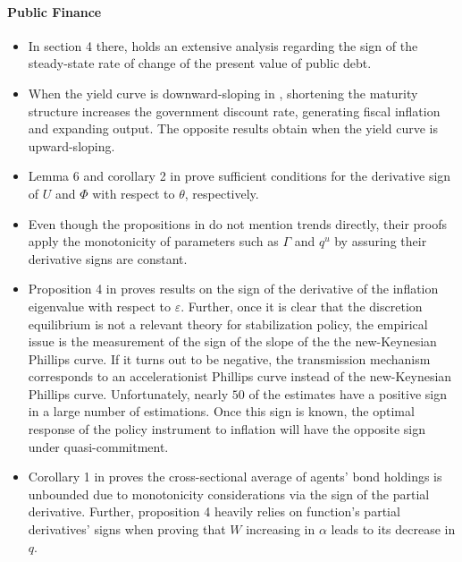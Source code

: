 \documentclass[11pt]{book}
\begin{document}
\paragraph{Public Finance}
\begin{itemize}
\item In section 4 there, \cite{englmann2015can}
holds an extensive analysis regarding the sign of the steady-state
rate of change of the present value of public debt.
\item When the yield curve is downward-sloping in \cite{corhay2016government},
shortening the maturity structure increases the government discount
rate, generating fiscal inflation and expanding output. The opposite
results obtain when the yield curve is upward-sloping.
\item Lemma 6 and corollary 2 in \cite{bursian2018trust}
prove sufficient conditions for the derivative sign of $U$ and $\Phi$
with respect to $\theta$, respectively.
\item Even though the propositions in \cite{haslag2020monetary}
do not mention trends directly, their proofs apply the monotonicity
of parameters such as $\Gamma$ and $q^{u}$ by assuring their derivative
signs are constant.
\item Proposition 4 in \cite{chatelain2021imperfect}
proves results on the sign of the derivative of the inflation eigenvalue
with respect to $\varepsilon$. Further, once it is clear that the
discretion equilibrium is not a relevant theory for stabilization
policy, the empirical issue is the measurement of the sign of the
slope of the the new-Keynesian Phillips curve. If it turns out to
be negative, the transmission mechanism corresponds to an accelerationist
Phillips curve instead of the new-Keynesian Phillips curve. Unfortunately,
nearly $50$ of the estimates have a positive sign in a large number
of estimations. Once this sign is known, the optimal response of the
policy instrument to inflation will have the opposite sign under quasi-commitment.
\item Corollary 1 in \cite{kocherlakota2021public}
proves the cross-sectional average of agents' bond holdings is unbounded
due to monotonicity considerations via the sign of the partial derivative.
Further, proposition 4 heavily relies on function's partial derivatives'
signs when proving that $W$ increasing in $\alpha$ leads to its
decrease in $q$.
\end{itemize}
\end{document}
